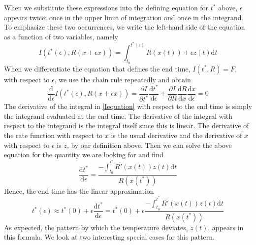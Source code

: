 \documentclass[12 pt]{article}
\begin{document}
When we substitute these expressions into the defining equation for $t^*$ above, $\epsilon$ appears twice: once in the upper limit of integration and once in the integrand. To emphasize these two occurrences, we write the left-hand side of the equation as a function of two variables, namely
\begin{equation} \label{Iequation}
    I(t^*(\epsilon),R(x+\epsilon x)) = \int _{t_0} ^{t^*(\epsilon)} R(x(t))+\epsilon z(t) \mathrm{d}t \tag*{Eq. S\theequation}
\end{equation}
When we differentiate the equation that defines the end time, $I(t^* ,R)=F$, with respect to $\epsilon$, we use the chain rule repeatedly and obtain
\begin{equation} 
    \frac{\mathrm{d}}{\mathrm{d}\epsilon}I(t^*(\epsilon),R(x+\epsilon x)) = \frac{\partial I}{\partial t^*} \frac{\mathrm{d}t^*}{\mathrm{d}\epsilon}+\frac{\partial I}{\partial R} \frac{\mathrm{d} R}{\mathrm{d} x} \frac{\mathrm{d}x}{\mathrm{d}\epsilon} = 0 \tag*{Eq. S\theequation}
\end{equation}
The derivative of the integral in \ref{Iequation} with respect to the end time is simply the integrand evaluated at the end time. The derivative of the integral with respect to the integrand is the integral itself since this is linear. The derivative of the rate function with respect to $x$ is the usual derivative and the derivative of $x$ with respect to $\epsilon$ is $z$, by our definition above. Then we can solve the above equation for the quantity we are looking for and find
\begin{equation} \label{dtdepsilon}
    \frac{\mathrm{d}t^*}{\mathrm{d}\epsilon}=\frac{- \int _{t_0} ^{t^*} R'(x(t)) z(t) \tag*{Eq. S\theequation} \mathrm{d}t}{R(x(t^*))}
\end{equation}
Hence, the end time has the linear approximation
\begin{equation}
    t^*(\epsilon) \approx t^*(0)+\epsilon \frac{\mathrm{d}t^*}{\mathrm{d}\epsilon}=t^*(0)+\epsilon \frac{- \int _{t_0} ^{t^*} R'(x(t)) z(t) \mathrm{d}t}{R(x(t^*))} \tag*{Eq. S\theequation}
\end{equation}
As expected, the pattern by which the temperature deviates, $z(t)$, appears in this formula. We look at two interesting special cases for this pattern. \par
\end{document}
